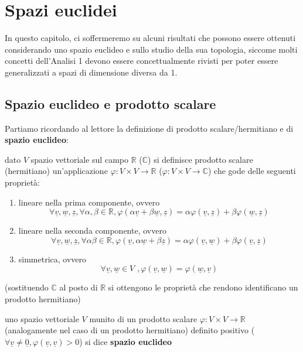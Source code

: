\documentclass[openany, italian]{book}
\begin{document}
	\chapter{Spazi euclidei}
	In questo capitolo, ci soffermeremo su alcuni risultati che possono essere ottenuti considerando uno spazio euclideo e sullo studio della sua topologia, siccome molti concetti dell'Analisi 1 devono essere concettualmente rivisti per poter essere generalizzati a spazi di dimensione diversa da 1.
	\section{Spazio euclideo e prodotto scalare}
	Partiamo ricordando al lettore la definizione di prodotto scalare/hermitiano e di \textbf{spazio euclideo}:
	\begin{definition}
	dato $V$ spazio vettoriale sul campo $\mathbb{R}$ ($\mathbb{C}$) si definisce prodotto scalare (hermitiano) un'applicazione $\varphi: V \times V \to \mathbb{R}$ ($\varphi: V \times V \to \mathbb{C}$) che gode delle seguenti proprietà:
	\begin{enumerate}[label=\protect\circled{\arabic*}]
		\item lineare nella prima componente, ovvero
		$$
		\forall \underline{v}, \underline{w}, \underline{z}, \forall \alpha, \beta \in \mathbb{R}, \varphi(\alpha \underline{v} + \beta \underline{w}, \underline{z}) = \alpha \varphi(\underline{v}, \underline{z}) + \beta \varphi(\underline{w}, \underline{z})
		$$
		\item lineare nella seconda componente, ovvero
		$$
		\forall \underline{v}, \underline{w}, \underline{z}, \forall \alpha \beta \in \mathbb{R}, \varphi(\underline{v}, \alpha \underline{w} + \beta \underline{z}) = \alpha \varphi(\underline{v}, \underline{w}) + \beta \varphi(\underline{v}, \underline{z})
		$$
		\item simmetrica, ovvero
		$$
		\forall \underline{v}, \underline{w} \in V \, \, , \varphi(\underline{v}, \underline{w}) = \varphi(\underline{w}, \underline{v})
		$$
	\end{enumerate}
	(sostituendo $\mathbb{C}$ al posto di $\mathbb{R}$ si ottengono le proprietà che rendono identificano un prodotto hermitiano)
	\end{definition}
	\begin{definition}
		uno spazio vettoriale $V$ munito di un prodotto scalare $\varphi: V \times V \to \mathbb{R}$ (analogamente nel caso di un prodotto hermitiano) definito positivo ($\forall \underline{v} \neq \underline{0}, \varphi(\underline{v}, \underline{v}) > 0$) si dice \textbf{spazio euclideo}
	\end{definition}
\end{document}
